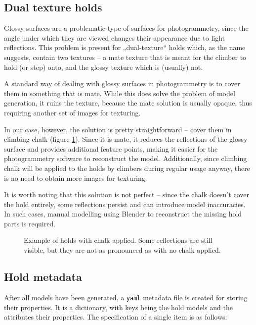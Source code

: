 \subsection{Dual texture holds}\label{sec:dual}
Glossy surfaces are a problematic type of surfaces for photogrammetry, since the angle under which they are viewed changes their appearance due to light reflections.
This problem is present for „dual-texture“ holds which, as the name suggests, contain two textures -- a mate texture that is meant for the climber to hold (or step) onto, and the glossy texture which is (usually) not.

A standard way of dealing with glossy surfaces in photogrammetry is to cover them in something that is mate.
While this does solve the problem of model generation, it ruins the texture, because the mate solution is usually opaque, thus requiring another set of images for texturing.

In our case, however, the solution is pretty straightforward -- cover them in climbing chalk (figure \ref{fig:chalk}).
Since it is mate, it reduces the reflections of the glossy surface and provides additional feature points, making it easier for the photogrammetry software to reconstruct the model.
Additionally, since climbing chalk will be applied to the holds by climbers during regular usage anyway, there is no need to obtain more images for texturing.

It is worth noting that this solution is not perfect -- since the chalk doesn't cover the hold entirely, some reflections persist and can introduce model inaccuracies.
In such cases, manual modelling using Blender to reconstruct the missing hold parts is required.

\begin{figure}[h]
	\centering
	\hfill
	\hfill
	\caption{Example of holds with chalk applied. Some reflections are still visible, but they are not as pronounced as with no chalk applied.}%
	\label{fig:chalk}
\end{figure}

\subsection{Hold metadata}
After all models have been generated, a \verb|yaml| metadata file is created for storing their properties.
It is a dictionary, with keys being the hold models and the attributes their properties.
The specification of a single item is as follows:

